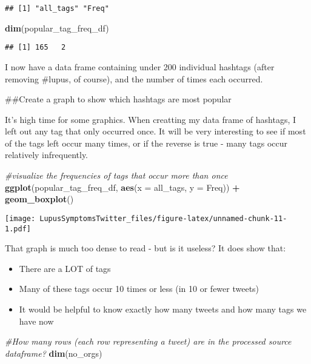 \documentclass[]{article}
\newenvironment{Shaded}{\begin{snugshade}}{\end{snugshade}}
\newcommand{\CommentTok}[1]{\textcolor[rgb]{0.56,0.35,0.01}{\textit{#1}}}
\newcommand{\DataTypeTok}[1]{\textcolor[rgb]{0.13,0.29,0.53}{#1}}
\newcommand{\KeywordTok}[1]{\textcolor[rgb]{0.13,0.29,0.53}{\textbf{#1}}}
\newcommand{\NormalTok}[1]{#1}
\newcommand{\OperatorTok}[1]{\textcolor[rgb]{0.81,0.36,0.00}{\textbf{#1}}}
\newcommand{\StringTok}[1]{\textcolor[rgb]{0.31,0.60,0.02}{#1}}
\providecommand{\tightlist}{%
  \setlength{\itemsep}{0pt}\setlength{\parskip}{0pt}}
\begin{document}
\begin{verbatim}
## [1] "all_tags" "Freq"
\end{verbatim}

\begin{Shaded}
\begin{Highlighting}[]
\KeywordTok{dim}\NormalTok{(popular_tag_freq_df)}
\end{Highlighting}
\end{Shaded}

\begin{verbatim}
## [1] 165   2
\end{verbatim}

I now have a data frame containing under 200 individual hashtags (after
removing \#lupus, of course), and the number of times each occurred.

\#\#Create a graph to show which hashtags are most popular

It's high time for some graphics. When creatting my data frame of
hashtags, I left out any tag that only occurred once. It will be very
interesting to see if most of the tags left occur many times, or if the
reverse is true - many tags occur relatively infrequently.

\begin{Shaded}
\begin{Highlighting}[]
\CommentTok{#visualize the frequencies of tags that occur more than once}
\KeywordTok{ggplot}\NormalTok{(popular_tag_freq_df, }\KeywordTok{aes}\NormalTok{(}\DataTypeTok{x =}\NormalTok{ all_tags, }\DataTypeTok{y =}\NormalTok{ Freq)) }\OperatorTok{+}
\StringTok{  }\KeywordTok{geom_boxplot}\NormalTok{()}
\end{Highlighting}
\end{Shaded}

\texttt{[image: LupusSymptomsTwitter\_files/figure-latex/unnamed-chunk-11-1.pdf]}

That graph is much too dense to read - but is it useless? It does show
that:

\begin{itemize}
\tightlist
\item
  There are a LOT of tags
\item
  Many of these tags occur 10 times or less (in 10 or fewer tweets)
\item
  It would be helpful to know exactly how many tweets and how many tags
  we have now
\end{itemize}

\begin{Shaded}
\begin{Highlighting}[]
\CommentTok{#How many rows (each row representing a tweet) are in the processed source dataframe?}
\KeywordTok{dim}\NormalTok{(no_orgs)}
\end{Highlighting}
\end{Shaded}
\end{document}
